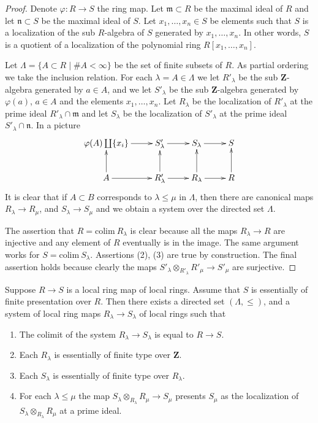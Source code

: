 \begin{proof}
Denote $\varphi : R  \to S$ the ring map.
Let $\mathfrak m \subset R$ be the maximal ideal
of $R$ and let $\mathfrak n \subset S$ be the maximal
ideal of $S$. Let $x_1,\ldots,x_n \in S$ be elements such that
$S$ is a localization of the sub $R$-algebra of $S$
generated by $x_1,\ldots, x_n$. In other words, $S$
is a quotient of a localization of the polynomial ring
$R[x_1,\ldots,x_n]$.

\medskip\noindent
Let $\Lambda = \{ A \subset R \mid \# A < \infty\}$
be the set of finite subsets of $R$. As partial
ordering we take the inclusion relation. For each
$\lambda = A \in \Lambda$ we let $R'_\lambda$ be
the sub $\mathbf{Z}$-algebra generated by
$a \in A$, and we let $S'_\lambda$ be the sub
$\mathbf{Z}$-algebra generated by $\varphi(a)$, $a \in A$
and the elements $x_1,\ldots, x_n$. Let $R_\lambda$ be
the localization of $R'_\lambda$ at the prime ideal
$R'_\lambda \cap \mathfrak m$ and let
$S_\lambda$ be the localization of $S'_\lambda$ at
the prime ideal $S'_\lambda \cap \mathfrak n$.
In a picture
$$
\xymatrix{
\varphi(A) \coprod \{x_i\} \ar[r] &
S'_\lambda \ar[r] &
S_\lambda \ar[r] &
S \\
A \ar[r] \ar[u] &
R'_\lambda \ar[r] \ar[u] &
R_\lambda \ar[r] \ar[u] &
R \ar[u]
}
$$
It is clear that if $A \subset B$ corresponds to
$\lambda \leq \mu$ in $\Lambda$, then there are
canonical maps $R_\lambda \to R_\mu$, and $S_\lambda \to S_\mu$
and we obtain a system over the directed set $\Lambda$.

\medskip\noindent
The assertion that $R = \text{colim}\ R_\lambda$ is clear
because all the maps $R_\lambda \to R$ are injective and
any element of $R$ eventually is in the image. The same
argument works for $S = \text{colim}\ S_\lambda$. 
Assertions (2), (3) are true by construction. 
The final assertion holds because clearly
the maps $S'_\lambda \otimes_{R'_\lambda} R'_\mu
\to S'_\mu$ are surjective.
\end{proof}

\begin{lemma}
\label{lemma-limit-essentially-finite-presentation}
Suppose $R \to S$ is a local ring map of local rings.
Assume that $S$ is essentially of finite presentation over $R$.
Then there exists a directed set $(\Lambda, \leq)$, and
a system of local ring maps $R_\lambda \to S_\lambda$
of local rings such that
\begin{enumerate}
\item The colimit of the system $R_\lambda \to S_\lambda$
is equal to $R \to S$.
\item Each $R_\lambda$ is essentially of finite type
over $\mathbf{Z}$.
\item Each $S_\lambda$ is essentially of finite type
over $R_\lambda$.
\item For each $\lambda \leq \mu$ the map
$S_\lambda \otimes_{R_\lambda} R_\mu \to S_\mu$
presents $S_\mu$ as the localization of
$S_\lambda \otimes_{R_\lambda} R_\mu$
at a prime ideal.
\end{enumerate}
\end{lemma}

